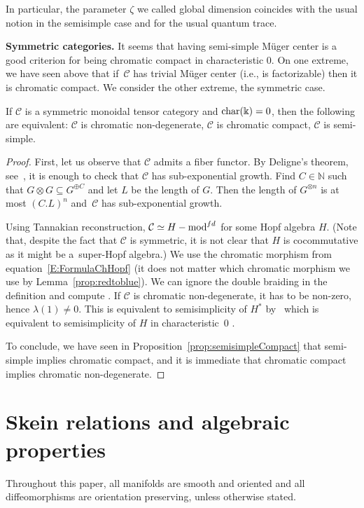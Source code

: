 \documentclass[pdftex]{sigma}
\numberwithin{equation}{section}
\numberwithin{theorem}{section}
\numberwithin{proposition}{section}
\numberwithin{definition}{section}
\numberwithin{lemma}{section}
\numberwithin{corollary}{section}
\numberwithin{remark}{section}
\numberwithin{example}{section}
\newcommand{\cat}{\mathcal{C}}
\newcommand{\FK}{{\Bbbk}}
\begin{document}
In particular, the parameter $\zeta$ we called global dimension coincides with the usual notion in the semisimple case and for the usual quantum trace.

{\bf Symmetric categories.} It seems that having semi-simple M\"uger center is a good criterion for being chromatic compact in characteristic 0. On one extreme, we have seen above that if~$\cat$ has trivial M\"uger center (i.e., is factorizable) then it is chromatic compact. We consider the other extreme, the symmetric case. %
\begin{proposition}\label{P:symcase}
If $\cat$ is a symmetric monoidal tensor category and ${\rm char}(\FK)=0$, then the following are equivalent: $\cat$ is chromatic non-degenerate, $\cat$ is chromatic compact, $\cat$ is semi-simple.
\end{proposition}
\begin{proof}
First, let us observe that $\cat$ admits a fiber functor. By Deligne's theorem, see~\cite[Theorem~9.11.4]{EGNO}, it is enough to check that $\cat$ has sub-exponential growth. Find $C\in \mathbb{N}$ such that $G\otimes G \subseteq G^{\oplus C}$ and let $L$ be the length of $G$. Then the length of $G^{\otimes n}$ is at most $(C.L)^n$ and~$\cat$ has sub-exponential growth.

Using Tannakian reconstruction, $\cat \simeq H-{\rm mod}^{fd}$ for some Hopf algebra $H$. (Note that, despite the fact that $\cat$ is symmetric, it is not clear that $H$ is cocommutative as it might be a~super-Hopf algebra.)
We use the chromatic morphism from equation~\ref{E:FormulaChHopf} (it does not matter which chromatic morphism we use by Lemma~\ref{prop:redtoblue}). We can ignore the double braiding in the definition and compute . If $\cat$ is chromatic non-degenerate, it has to be non-zero, hence $\lambda(1) \neq0$. This is equivalent to semisimplicity of $H^*$ by~\cite{Radford} which is equivalent to semisimplicity of $H$ in characteristic~0 \cite{RadfordLarson}.

 To conclude, we have seen in Proposition~\ref{prop:semisimpleCompact} that semi-simple implies chromatic compact, and it is immediate that chromatic compact implies chromatic non-degenerate.
\end{proof}


\section{Skein relations and algebraic properties}
Throughout this paper, all manifolds are smooth and oriented and all
diffeomorphisms are orientation preserving, unless otherwise stated.
\end{document}
